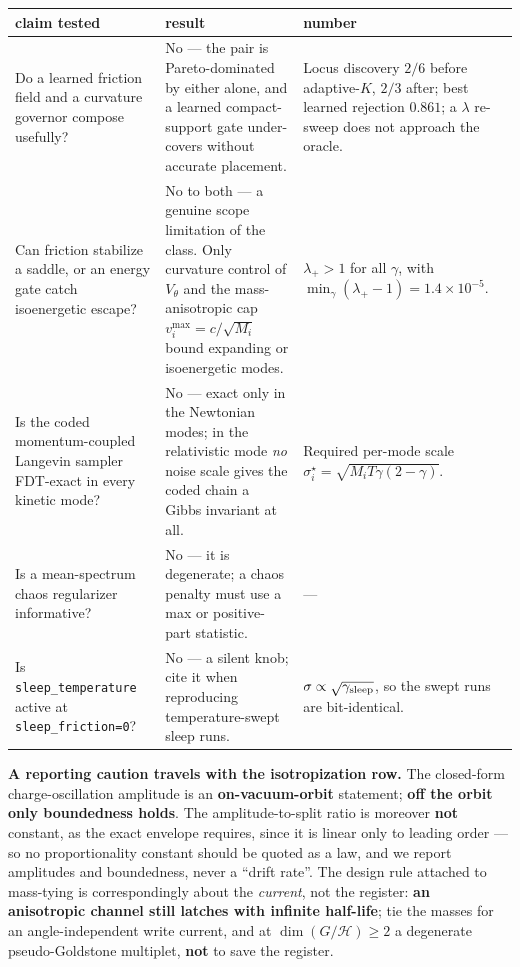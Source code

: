 \documentclass{article}
\begin{document}
\begin{center}\scriptsize
\begin{tabular}{@{}p{1.52in} p{1.52in} p{2.06in}@{}}
\toprule
claim tested & result & number \\
\midrule

Do a learned friction field and a curvature governor compose usefully? &
No --- the pair is Pareto-dominated by either alone, and a learned compact-support gate under-covers without accurate placement. &
Locus discovery $2/6$ before adaptive-$K$, $2/3$ after; best learned rejection $0.861$; a $\lambda$ re-sweep does not approach the oracle. \\[2pt]
Can friction stabilize a saddle, or an energy gate catch isoenergetic escape? &
No to both --- a genuine scope limitation of the class. Only curvature control of $V_\theta$ and the mass-anisotropic cap $v_i^{\max}=c/\sqrt{M_i}$ bound expanding or isoenergetic modes. &
$\lambda_+>1$ for all $\gamma$, with $\min_\gamma(\lambda_+-1)=1.4{\times}10^{-5}$. \\[2pt]
Is the coded momentum-coupled Langevin sampler FDT-exact in every kinetic mode? &
No --- exact only in the Newtonian modes; in the relativistic mode \emph{no} noise scale gives the coded chain a Gibbs invariant at all. &
Required per-mode scale $\sigma^\star_i=\sqrt{M_iT\gamma(2-\gamma)}$. \\[2pt]
Is a mean-spectrum chaos regularizer informative? &
No --- it is degenerate; a chaos penalty must use a max or positive-part statistic. &
--- \\[2pt]
Is \texttt{sleep\_temperature} active at \texttt{sleep\_friction=0}? &
No --- a silent knob; cite it when reproducing temperature-swept sleep runs. &
$\sigma\propto\sqrt{\gamma_{\rm sleep}}$, so the swept runs are bit-identical. \\
\bottomrule
\end{tabular}
\end{center}

\textbf{A reporting caution travels with the isotropization row.} The closed-form charge-oscillation amplitude is an \textbf{on-vacuum-orbit} statement; \textbf{off the orbit only boundedness holds}. The amplitude-to-split ratio is moreover \textbf{not} constant, as the exact envelope requires, since it is linear only to leading order --- so no proportionality constant should be quoted as a law, and we report amplitudes and boundedness, never a ``drift rate''. The design rule attached to mass-tying is correspondingly about the \emph{current}, not the register: \textbf{an anisotropic channel still latches with infinite half-life}; tie the masses for an angle-independent write current, and at $\dim(G/\mathcal H)\ge2$ a degenerate pseudo-Goldstone multiplet, \textbf{not} to save the register.
\end{document}

